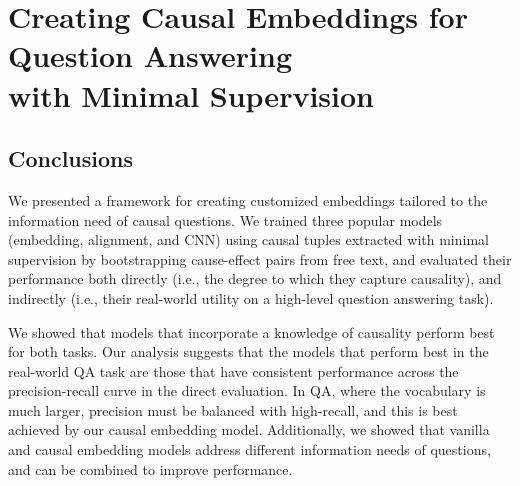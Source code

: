 
\chapter{Creating Causal Embeddings for Question Answering \\with Minimal Supervision \label{chapter:emnlp2016}}



%
%







\section{Conclusions}
\label{sec-emnlp2016:conclusion}
We presented a framework for creating customized embeddings tailored to the information need of causal questions.  We trained three popular models (embedding, alignment, and CNN) using causal tuples extracted with minimal supervision by bootstrapping cause-effect pairs from free text, and evaluated their performance both directly (i.e., the degree to which they capture causality), and indirectly (i.e., their real-world utility on a high-level question answering task). 


We showed that models that incorporate a knowledge of causality perform best for both tasks. 
Our analysis suggests that the models that perform best in the real-world QA task are those that have consistent performance across the precision-recall curve in the direct evaluation.
In QA, where the vocabulary is much larger, precision must be balanced with high-recall, and this is best achieved by our causal embedding model.  Additionally, we showed that vanilla and causal embedding models address different information needs of questions, and can be combined to improve performance. 

